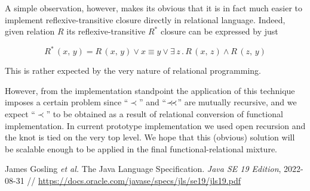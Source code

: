 \documentclass{article}
\newcommand{\precprec}{\prec\mathrel{\mkern-5mu}\prec}
\begin{document}
A simple observation, however, makes its obvious that it is in fact much easier to implement reflexive-transitive closure directly
in relational language. Indeed, given relation $R$ its reflexive-transitive $R^*$ closure can be expressed by just

\[
R^*\,(x,\, y) = R\, (x,\, y)\vee x\equiv y\vee\exists\, z\,.\,R\,(x,\,z)\wedge R\,(z,\,y)
\]

This is rather expected by the very nature of relational programming.

However, from the implementation standpoint the application of this technique imposes a certain problem since ``$\prec$'' and ``$\precprec$''
are mutually recursive, and we expect ``$\prec$'' to be obtained as a result of relational conversion of functional implementation. In current
prototype implementation we used open recursion and the knot is tied on the very top level. We hope that this (obvious) solution will be
scalable enough to be applied in the final functional-relational mixture.


\begin{thebibliography}{99}
  James Gosling \emph{et al.} The Java Language Specification. \emph{Java SE 19 Edition}, 2022-08-31 //
  \url{https://docs.oracle.com/javase/specs/jls/se19/jls19.pdf}
\end{thebibliography}
\end{document}
